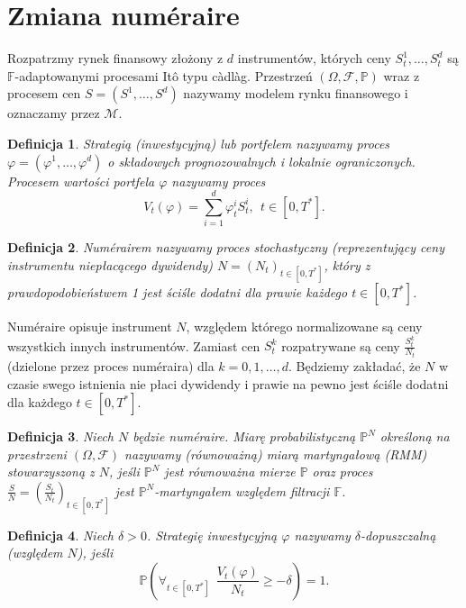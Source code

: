 \documentclass{mini}
\theoremstyle{mythstyle}
\newtheorem{Definicja}{Definicja}[chapter]
\begin{document}
\section{Zmiana num\'{e}raire}

	Rozpatrzmy rynek finansowy złożony z $d$ instrumentów, których ceny $S_t^1,\ldots,S_t^d$ są $\mathbb{F}$-adaptowanymi procesami It\^{o} typu c\`{a}dl\`{a}g. Przestrzeń $(\Omega,\mathcal{F}, \mathbb{P})$ wraz z procesem cen $S=(S^1,\ldots,S^d)$ nazywamy modelem rynku finansowego i oznaczamy przez $\mathcal{M}$.\\
	\begin{Definicja}
	Strategią (inwestycyjną) lub portfelem nazywamy proces $\varphi=(\varphi^1,\ldots,\varphi^d)$ o składowych prognozowalnych i lokalnie ograniczonych. Procesem wartości portfela $\varphi$ nazywamy proces \[ V_t(\varphi)=\sum_{i=1}^d\varphi_t^iS_t^i, \ \ t\in[0,T^*]. \]
\end{Definicja}

\begin{Definicja}
	Num\'{e}rairem nazywamy proces stochastyczny (reprezentujący ceny instrumentu niepłacącego dywidendy) $N = (N_t)_{t\in [0,T^*]}$, który z prawdopodobieństwem 1 jest ściśle dodatni dla prawie każdego $t\in [0,T^*]$.
\end{Definicja}
	Num\'{e}raire opisuje instrument $N$, względem którego normalizowane są ceny wszystkich innych instrumentów. Zamiast cen $S_t^k$ rozpatrywane są ceny $\frac{S_t^k}{N_t}$ (dzielone przez proces num\'{e}raira) dla $k=0,1,\ldots,d$. Będziemy zakładać, że $N$ w czasie swego istnienia nie płaci dywidendy i prawie na pewno jest ściśle dodatni dla każdego $t\in [0,T^*]$.\\
\begin{Definicja}
	Niech $N$ będzie num\'{e}raire. Miarę probabilistyczną $\mathbb{P}^N$ określoną na przestrzeni $(\Omega,\mathcal{F})$ nazywamy (równoważną) miarą martyngałową (RMM) stowarzyszoną z $N$, jeśli $\mathbb{P}^N$ jest równoważna mierze $\mathbb{P}$ oraz proces $\frac{S}{N}=(\frac{S_t}{N_t})_{t\in [0,T^*]}$ jest $\mathbb{P}^N$-martyngałem względem filtracji $\mathbb{F}$.\\
\end{Definicja}
\begin{Definicja}
	Niech $\delta>0$. Strategię inwestycyjną $\varphi$ nazywamy $\delta$-dopuszczalną (względem $N$), jeśli \[ \mathbb{P}\left(\forall_{t\in [0,T^*]} \ \ \frac{V_t(\varphi)}{N_t}\geq -\delta \right) = 1. \]
\end{Definicja}
\end{document}
